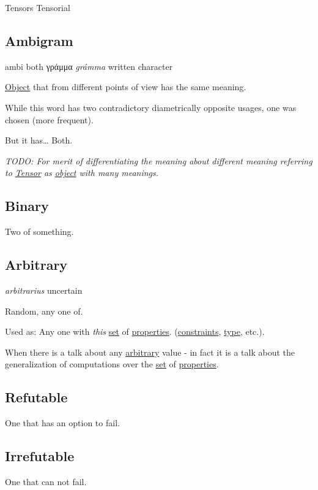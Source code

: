 \documentclass[a4paper,14pt,oneside]{book}
\begin{document}
\label{org53e7679}Tensors
\label{orgd4aeb35}Tensorial

\subsection{\label{orga89dc15}Ambigram}
\label{sec:orgae8cc39}
ambi both
γράμμα \emph{grámma} written character

\hyperref[orged022cb]{Object} that from different points of view has the same meaning.

While this word has two contradictory diametrically opposite usages, one was chosen (more frequent).

But it has\ldots{} Both.

\emph{TODO: For merit of differentiating the meaning about different meaning referring to \hyperref[org5e20eb3]{Tensor} as \hyperref[orged022cb]{object} with many meanings.}

\subsection{\label{orgb210b36}Binary}
\label{sec:org1fad3cc}
Two of something.

\subsection{\label{org326f4d0}Arbitrary}
\label{sec:org1dd1f88}
\emph{arbitrarius} uncertain

Random, any one of.

Used as: Any one with \emph{this} \hyperref[org128a409]{set} of \hyperref[orgff8ecf0]{properties}. (\hyperref[org2daa28c]{constraints}, \hyperref[org1eff537]{type}, etc.).

When there is a talk about any \hyperref[org326f4d0]{arbitrary} value - in fact it is a talk about the generalization of computations over the \hyperref[org128a409]{set} of \hyperref[orgff8ecf0]{properties}.

\subsection{\label{org4e3fade}Refutable}
\label{sec:orgece2e57}
One that has an option to fail.

\subsection{\label{org4bf03fe}Irrefutable}
\label{sec:org207accf}
One that can not fail.
\end{document}
